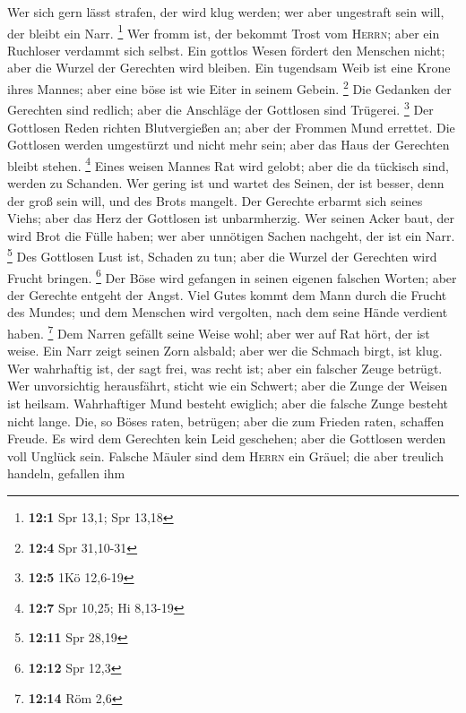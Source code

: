  Wer sich gern lässt strafen, der wird klug werden; wer
aber ungestraft sein will, der bleibt ein Narr. \footnote{\textbf{12:1}
  Spr 13,1; Spr 13,18}  Wer fromm ist, der bekommt Trost
vom \textsc{Herrn}; aber ein Ruchloser verdammt sich selbst.
 Ein gottlos Wesen fördert den Menschen nicht; aber die
Wurzel der Gerechten wird bleiben.  Ein tugendsam Weib ist
eine Krone ihres Mannes; aber eine böse ist wie Eiter in seinem Gebein.
\footnote{\textbf{12:4} Spr 31,10-31}  Die Gedanken der
Gerechten sind redlich; aber die Anschläge der Gottlosen sind Trügerei.
\footnote{\textbf{12:5} 1Kö 12,6-19}  Der Gottlosen Reden
richten Blutvergießen an; aber der Frommen Mund errettet. 
Die Gottlosen werden umgestürzt und nicht mehr sein; aber das Haus der
Gerechten bleibt stehen. \footnote{\textbf{12:7} Spr 10,25; Hi 8,13-19}
 Eines weisen Mannes Rat wird gelobt; aber die da tückisch
sind, werden zu Schanden.  Wer gering ist und wartet des
Seinen, der ist besser, denn der groß sein will, und des Brots mangelt.
 Der Gerechte erbarmt sich seines Viehs; aber das Herz
der Gottlosen ist unbarmherzig.  Wer seinen Acker baut,
der wird Brot die Fülle haben; wer aber unnötigen Sachen nachgeht, der
ist ein Narr. \footnote{\textbf{12:11} Spr 28,19}  Des
Gottlosen Lust ist, Schaden zu tun; aber die Wurzel der Gerechten wird
Frucht bringen. \footnote{\textbf{12:12} Spr 12,3}  Der
Böse wird gefangen in seinen eigenen falschen Worten; aber der Gerechte
entgeht der Angst.  Viel Gutes kommt dem Mann durch die
Frucht des Mundes; und dem Menschen wird vergolten, nach dem seine Hände
verdient haben. \footnote{\textbf{12:14} Röm 2,6}  Dem
Narren gefällt seine Weise wohl; aber wer auf Rat hört, der ist weise.
 Ein Narr zeigt seinen Zorn alsbald; aber wer die Schmach
birgt, ist klug.  Wer wahrhaftig ist, der sagt frei, was
recht ist; aber ein falscher Zeuge betrügt.  Wer
unvorsichtig herausfährt, sticht wie ein Schwert; aber die Zunge der
Weisen ist heilsam.  Wahrhaftiger Mund besteht ewiglich;
aber die falsche Zunge besteht nicht lange.  Die, so
Böses raten, betrügen; aber die zum Frieden raten, schaffen Freude.
 Es wird dem Gerechten kein Leid geschehen; aber die
Gottlosen werden voll Unglück sein.  Falsche Mäuler sind
dem \textsc{Herrn} ein Gräuel; die aber treulich handeln, gefallen ihm
